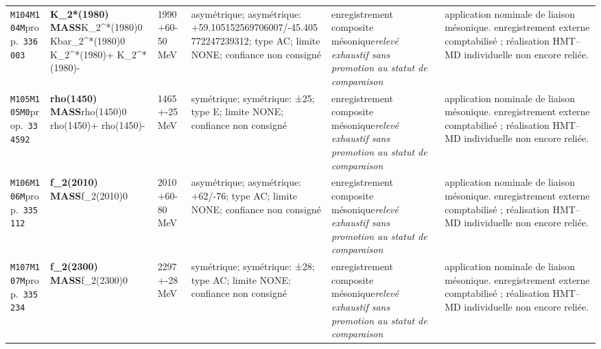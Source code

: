 \begin{landscape}
\begin{longtable}{L{1.85cm}L{4.45cm}L{2.35cm}L{4.05cm}L{3.35cm}L{7.15cm}}
\texttt{M104}\newline \texttt{M104M}\newline prop.\ \texttt{336003} & \textbf{K\_\allowbreak{}2*(1980) MASS}\newline K\_\allowbreak{}2\textasciicircum{}*(1980)0 \textbar{}\allowbreak{} Kbar\_\allowbreak{}2\textasciicircum{}*(1980)0 \textbar{}\allowbreak{} K\_\allowbreak{}2\textasciicircum{}*(1980)+ \textbar{}\allowbreak{} K\_\allowbreak{}2\textasciicircum{}*(1980)- & 1990+60-50\,MeV & asymétrique; asymétrique: +59.105152569706007/-45.405772247239312; type AC; limite NONE; confiance non consigné & enregistrement composite mésonique\newline \emph{relevé exhaustif sans promotion au statut de comparaison} & application nominale de liaison mésonique. enregistrement externe comptabilisé ; réalisation HMT--MD individuelle non encore reliée. \\
\texttt{M105}\newline \texttt{M105M0}\newline prop.\ \texttt{334592} & \textbf{rho(1450) MASS}\newline rho(1450)0 \textbar{}\allowbreak{} rho(1450)+ \textbar{}\allowbreak{} rho(1450)- & 1465+-25\,MeV & symétrique; symétrique: ±25; type E; limite NONE; confiance non consigné & enregistrement composite mésonique\newline \emph{relevé exhaustif sans promotion au statut de comparaison} & application nominale de liaison mésonique. enregistrement externe comptabilisé ; réalisation HMT--MD individuelle non encore reliée. \\
\texttt{M106}\newline \texttt{M106M}\newline prop.\ \texttt{335112} & \textbf{f\_\allowbreak{}2(2010) MASS}\newline f\_\allowbreak{}2(2010)0 & 2010+60-80\,MeV & asymétrique; asymétrique: +62/-76; type AC; limite NONE; confiance non consigné & enregistrement composite mésonique\newline \emph{relevé exhaustif sans promotion au statut de comparaison} & application nominale de liaison mésonique. enregistrement externe comptabilisé ; réalisation HMT--MD individuelle non encore reliée. \\
\texttt{M107}\newline \texttt{M107M}\newline prop.\ \texttt{335234} & \textbf{f\_\allowbreak{}2(2300) MASS}\newline f\_\allowbreak{}2(2300)0 & 2297+-28\,MeV & symétrique; symétrique: ±28; type AC; limite NONE; confiance non consigné & enregistrement composite mésonique\newline \emph{relevé exhaustif sans promotion au statut de comparaison} & application nominale de liaison mésonique. enregistrement externe comptabilisé ; réalisation HMT--MD individuelle non encore reliée. \\

\end{longtable}
\end{landscape}
